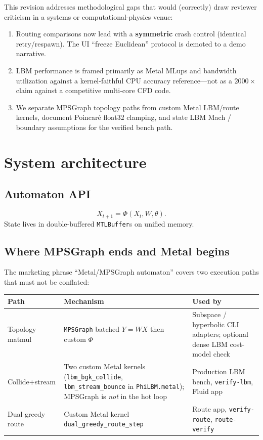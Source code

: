 \documentclass[11pt,a4paper]{article}
\begin{document}
This revision addresses methodological gaps that would (correctly) draw
reviewer criticism in a systems or computational-physics venue:
\begin{enumerate}[leftmargin=*]
  \item Routing comparisons now lead with a \textbf{symmetric} crash
        control (identical retry/respawn). The UI ``freeze Euclidean''
        protocol is demoted to a demo narrative.
  \item LBM performance is framed primarily as Metal MLups and bandwidth
        utilization against a kernel-faithful CPU accuracy reference---not
        as a $2000\times$ claim against a competitive multi-core CFD code.
  \item We separate MPSGraph topology paths from custom Metal LBM/route
        kernels, document Poincar\'e float32 clamping, and state LBM Mach /
        boundary assumptions for the verified bench path.
\end{enumerate}

\section{System architecture}
\label{sec:system}

\subsection{Automaton API}
\begin{equation}
  X_{t+1} = \Phi(X_t, W, \theta).
\end{equation}
State lives in double-buffered \texttt{MTLBuffer}s on unified memory.

\subsection{Where MPSGraph ends and Metal begins}
The marketing phrase ``Metal/MPSGraph automaton'' covers two execution
paths that must not be conflated:

\begin{center}
\begin{tabular}{@{}llp{}@{}}
\toprule
Path & Mechanism & Used by \\
\midrule
Topology matmul & \texttt{MPSGraph} batched $Y\!=\!WX$ then custom $\Phi$
  & Subspace / hyperbolic CLI adapters; optional dense LBM cost-model check \\
Collide+stream & Two custom Metal kernels (\texttt{lbm\_bgk\_collide},
  \texttt{lbm\_stream\_bounce} in \texttt{PhiLBM.metal}); MPSGraph is
  \emph{not} in the hot loop
  & Production LBM bench, \texttt{verify-lbm}, Fluid app \\
Dual greedy route & Custom Metal kernel \texttt{dual\_greedy\_route\_step}
  & Route app, \texttt{verify-route}, \texttt{route-verify} \\
\bottomrule
\end{tabular}
\end{center}
\end{document}
